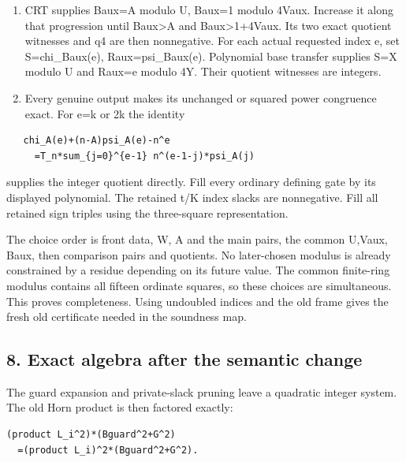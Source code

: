 \begin{enumerate}
\item CRT supplies Baux=\allowbreak{}A modulo U, Baux=\allowbreak{}1 modulo 4Vaux. Increase it along that progression until Baux\textgreater{}\allowbreak{}A and Baux\textgreater{}\allowbreak{}1+\allowbreak{}4Vaux. Its two exact quotient witnesses and q4 are then nonnegative. For each actual requested index e, set S=\allowbreak{}chi\_\allowbreak{}Baux(e), Raux=\allowbreak{}psi\_\allowbreak{}Baux(e). Polynomial base transfer supplies S=\allowbreak{}X modulo U and Raux=\allowbreak{}e modulo 4Y. Their quotient witnesses are integers.

\item Every genuine output makes its unchanged or squared power congruence exact. For e=\allowbreak{}k or 2k the identity

\end{enumerate}



\begin{verbatim}
   chi_A(e)+(n-A)psi_A(e)-n^e
     =T_n*sum_{j=0}^{e-1} n^(e-1-j)*psi_A(j)
\end{verbatim}

supplies the integer quotient directly. Fill every ordinary defining gate by its displayed polynomial. The retained t/\allowbreak{}K index slacks are nonnegative. Fill all retained sign triples using the three-square representation.



The choice order is front data, W, A and the main pairs, the common U,Vaux, Baux, then comparison pairs and quotients. No later-chosen modulus is already constrained by a residue depending on its future value. The common finite-ring modulus contains all fifteen ordinate squares, so these choices are simultaneous. This proves completeness. Using undoubled indices and the old frame gives the fresh old certificate needed in the soundness map.



\subsection*{8. Exact algebra after the semantic change}



The guard expansion and private-slack pruning leave a quadratic integer system. The old Horn product is then factored exactly:



\begin{verbatim}
(product L_i^2)*(Bguard^2+G^2)
  =(product L_i)^2*(Bguard^2+G^2).
\end{verbatim}

